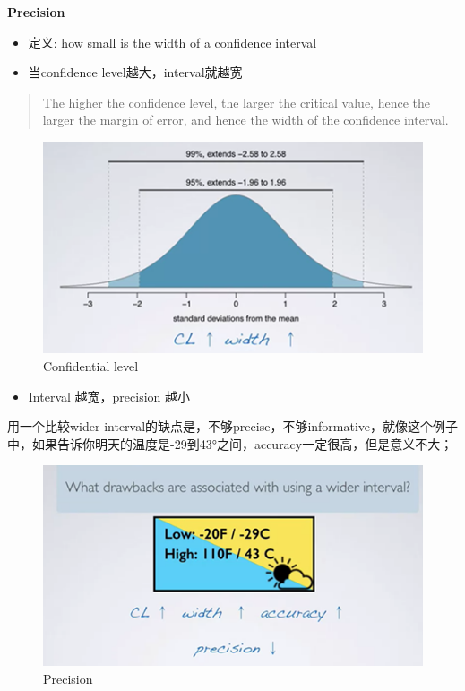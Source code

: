 \documentclass[]{book}
\providecommand{\tightlist}{%
  \setlength{\itemsep}{0pt}\setlength{\parskip}{0pt}}
\begin{document}
\textbf{Precision}

\begin{itemize}
\item
  定义: how small is the width of a confidence interval
\item
  当confidence level越大，interval就越宽
\end{itemize}

\begin{quote}
The higher the confidence level, the larger the critical value, hence
the larger the margin of error, and hence the width of the confidence
interval.
\end{quote}

\begin{figure}

{\centering \includegraphics[width=0.8\linewidth]{graphs/2-9} 

}

\caption{Confidential level}\label{fig:fig2-9}
\end{figure}

\begin{itemize}
\tightlist
\item
  Interval 越宽，precision 越小
\end{itemize}

用一个比较wider
interval的缺点是，不够precise，不够informative，就像这个例子中，如果告诉你明天的温度是-29到43°之间，accuracy一定很高，但是意义不大；

\begin{figure}

{\centering \includegraphics[width=0.8\linewidth]{graphs/2-10} 

}

\caption{Precision}\label{fig:fig2-10}
\end{figure}
\end{document}
